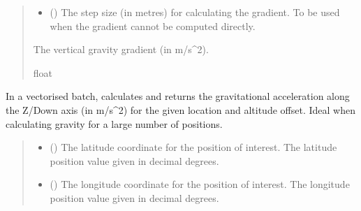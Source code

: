 \documentclass[letterpaper,10pt,english]{sphinxmanual}
\begin{document}
\begin{fulllineitems}
\begin{fulllineitems}
\begin{quote}
\begin{description}
\begin{itemize}
\item {} 
\sphinxAtStartPar
{} () \textendash{} The step size (in metres) for calculating the gradient.
To be used when the gradient cannot be computed directly.

\end{itemize}

\sphinxAtStartPar
The vertical gravity gradient (in m/s\textasciicircum{}2).

\sphinxAtStartPar
float

\end{description}\end{quote}

\end{fulllineitems}


\begin{fulllineitems}
\label{\detokenize{modules/gravity/base:qnav.gravity.base.GravityModel.calc_gravity_z_vec}}
\pysigstartsignatures
{}
\pysigstopsignatures
\sphinxAtStartPar
In a vectorised batch, calculates and returns the gravitational
acceleration along the Z/Down axis (in m/s\textasciicircum{}2) for the given location
and altitude offset. Ideal when calculating gravity for a large
number of positions.
\begin{quote}\begin{description}
\begin{itemize}
\item {} 
\sphinxAtStartPar
{} () \textendash{} The latitude coordinate for the position of interest.
The latitude position value given in decimal degrees.

\item {} 
\sphinxAtStartPar
{} () \textendash{} The longitude coordinate for the position of interest.
The longitude position value given in decimal degrees.


\end{itemize}
\end{description}
\end{quote}
\end{fulllineitems}
\end{fulllineitems}
\end{document}
